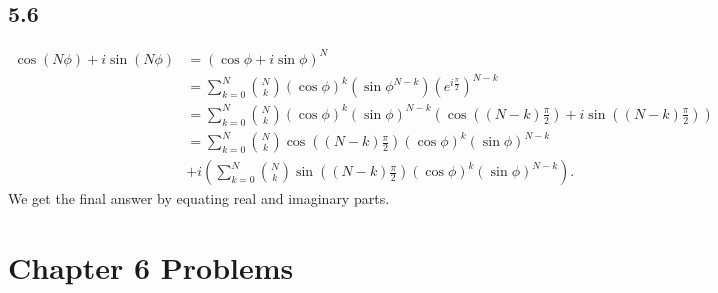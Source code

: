 \documentclass[10pt]{mypackage}
\begin{document}
\subsection{5.6}%
\begin{align*}
  \cos\left(N\phi\right) + i\sin\left(N\phi\right) &= \left(\cos \phi + i\sin\phi\right)^N\\
                                                   &= \sum_{k=0}^{N}{N\choose k}\left(\cos\phi\right)^{k}\left(\sin\phi^{N-k}\right)\left(e^{i\frac{\pi}{2}}\right)^{N-k}\\
                                                   &= \sum_{k=0}^{N}{N\choose k}\left(\cos\phi\right)^k\left(\sin\phi\right)^{N-k}\left(\cos\left(\left(N-k\right)\frac{\pi}{2}\right) + i\sin\left(\left(N-k\right)\frac{\pi}{2}\right)\right)\\
                                                   &= \sum_{k=0}^{N}{N\choose k}\cos\left(\left(N-k\right)\frac{\pi}{2}\right)\left(\cos\phi\right)^k\left(\sin\phi\right)^{N-k} \\
                                                   & +i\left(\sum_{k=0}^{N}{N\choose k}\sin\left(\left(N-k\right)\frac{\pi}{2}\right)\left(\cos\phi\right)^k\left(\sin\phi\right)^{N-k}\right).
\end{align*}
We get the final answer by equating real and imaginary parts.
\section{Chapter 6 Problems}%
\end{document}
